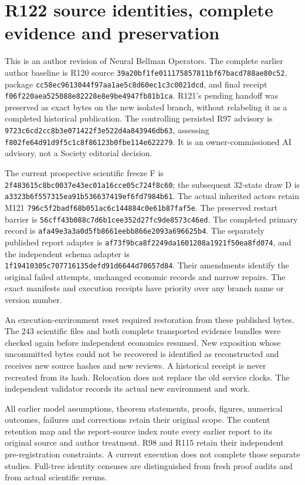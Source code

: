 \section{R122 source identities, complete evidence and preservation}
\label{dev:r122}
This is an author revision of Neural Bellman Operators. The complete earlier
author baseline is R120 source
\nolinkurl{39a20bf1fe011175857811bf67bacd788ae80c52}, package
\nolinkurl{cc58ec9613044f97aa1ae5c8d60ec1c3c0021dcd}, and final receipt
\nolinkurl{f06f220aea525088e82228e8e9be4947fb81b1ca}. R121's pending handoff
was preserved as exact bytes on the new isolated branch, without relabeling
it as a completed historical publication. The controlling persisted R97
advisory is \nolinkurl{9723c6cd2cc8b3e071422f3e522d4a843946db63}, assessing
\nolinkurl{f802fe64d91d9f5c1c8f86123b0fbe114e622279}. It is an
owner-commissioned AI advisory, not a Society editorial decision.

The current prospective scientific freeze F is
\nolinkurl{2f483615c8bc0037e43ec01a16cce05c724f8c60}; the subsequent
32-state draw D is \nolinkurl{a3323b6f557315ea91b536637419ef6fd7984b61}.
The actual inherited actors retain M121
\nolinkurl{796c5f2badf68b051ac6c144884c0e61b87faf5e}.
The preserved restart barrier is
\nolinkurl{56cff43b088c7d6b1cee352d27fc9de8573c46ed}.
The completed primary record is
\nolinkurl{afa49e3a3a0d5fb8661eebb866e2093a696625b4}.
The separately published report adapter is
\nolinkurl{af73f9bca8f2249da1601208a1921f50ea8fd074}, and the independent
schema adapter is \nolinkurl{1f19410305c707716135defd91d6644d70657d84}.
Their amendments identify the original failed attempts, unchanged economic
records and narrow repairs. The exact manifests and execution receipts have
priority over any branch name or version number.

An execution-environment reset required restoration from these published
bytes. The 243 scientific files and both complete transported evidence bundles
were checked again before independent economics resumed. New exposition whose
uncommitted bytes could not be recovered is identified as reconstructed and
receives new source hashes and new reviews. A historical receipt is never
recreated from its hash. Relocation does not replace the old service clocks.
The independent validator records its actual new environment and work.

All earlier model assumptions, theorem statements, proofs, figures, numerical
outcomes, failures and corrections retain their original scope. The content
retention map and the report-source index route every earlier report to its
original source and author treatment. R98 and R115 retain their independent
pre-registration constraints. A current execution does not complete those
separate studies. Full-tree identity censuses are distinguished from fresh
proof audits and from actual scientific reruns.


